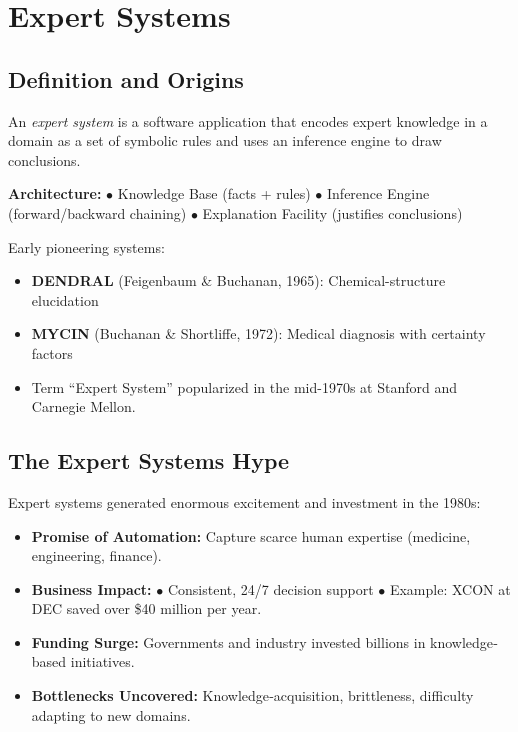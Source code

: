 \documentclass[12pt]{article}
\begin{document}
\section{Expert Systems}

\subsection{Definition and Origins}
An \emph{expert system} is a software application that encodes expert knowledge in a domain as a set of symbolic rules and uses an inference engine to draw conclusions.

\colorbox{green!10}{%
  \parbox{\textwidth}{%
    \textbf{Architecture:}  
    \(\bullet\) Knowledge Base (facts + rules)  
    \(\bullet\) Inference Engine (forward/backward chaining)  
    \(\bullet\) Explanation Facility (justifies conclusions)
  }%
}

Early pioneering systems:
\begin{itemize}
  \item \textbf{DENDRAL} (Feigenbaum \& Buchanan, 1965): Chemical-structure elucidation  
  \item \textbf{MYCIN} (Buchanan \& Shortliffe, 1972): Medical diagnosis with certainty factors  
  \item Term “Expert System” popularized in the mid-1970s at Stanford and Carnegie Mellon.
\end{itemize}

\subsection{The Expert Systems Hype}
Expert systems generated enormous excitement and investment in the 1980s:

\begin{itemize}
  \item \textbf{Promise of Automation:} Capture scarce human expertise (medicine, engineering, finance).
  \item \textbf{Business Impact:}  
    \(\bullet\) Consistent, 24/7 decision support  
    \(\bullet\) Example: XCON at DEC saved over \$40 million per year.
  \item \textbf{Funding Surge:} Governments and industry invested billions in knowledge‐based initiatives.
  \item \textbf{Bottlenecks Uncovered:} Knowledge‐acquisition, brittleness, difficulty adapting to new domains.
\end{itemize}
\end{document}
